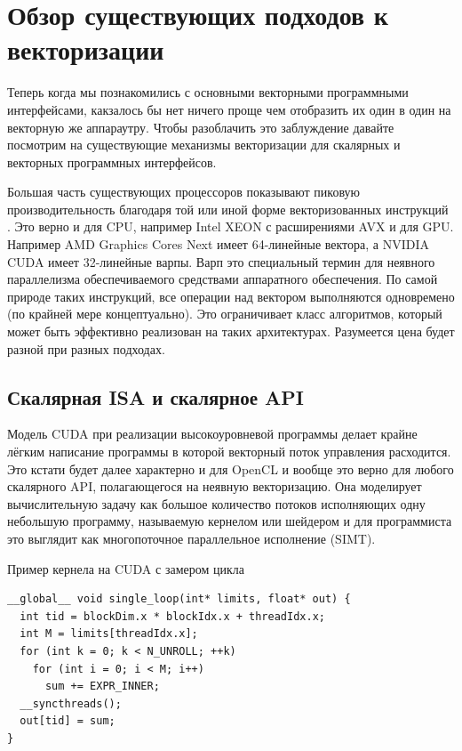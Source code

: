 \section{Обзор существующих подходов к векторизации}\label{sec:overview/vectorizing}

Теперь когда мы познакомились с основными векторными программными интерфейсами, какзалось бы нет ничего проще чем отобразить их один в один на векторную же аппараутру. Чтобы разоблачить это заблуждение давайте посмотрим на существующие механизмы векторизации для скалярных и векторных программных интерфейсов.

Большая часть существующих процессоров показывают пиковую производительность благодаря той или иной форме векторизованных инструкций \cite{bialas2015benchmarking}. Это верно и для CPU, например Intel XEON с расширениями AVX и для GPU. Например AMD Graphics Cores Next имеет 64-линейные вектора, а NVIDIA CUDA имеет 32-линейные варпы. Варп \cite{passerat2015warp} это специальный термин для неявного параллелизма обеспечиваемого средствами аппаратного обеспечения. По самой природе таких инструкций, все операции над вектором выполняются одновремено (по крайней мере концептуально). Это ограничивает класс алгоритмов, который может быть эффективно реализован на таких архитектурах. Разумеется цена будет разной при разных подходах.

\subsection{Скалярная ISA и скалярное API}\label{subsec:overview/vectorizing/cuda}

Модель CUDA при реализации высокоуровневой программы делает крайне лёгким написание программы в которой векторный поток управления расходится. Это кстати будет далее характерно и для OpenCL и вообще это верно для любого скалярного API, полагающегося на неявную векторизацию. Она моделирует вычислительную задачу как большое количество потоков исполняющих одну небольшую программу, называемую кернелом или шейдером и для программиста это выглядит как многопоточное параллельное исполнение (SIMT).

\begin{ListingEnv}[!h]
    \captiondelim{ } 
    \caption{Пример кернела на CUDA с замером цикла}\label{lst:cudashader}
    \begin{lstlisting}[language={[ISO]C++}]
__global__ void single_loop(int* limits, float* out) {
  int tid = blockDim.x * blockIdx.x + threadIdx.x;
  int M = limits[threadIdx.x];
  for (int k = 0; k < N_UNROLL; ++k)
    for (int i = 0; i < M; i++)
      sum += EXPR_INNER;
  __syncthreads();
  out[tid] = sum;
}
    \end{lstlisting}
\end{ListingEnv}

